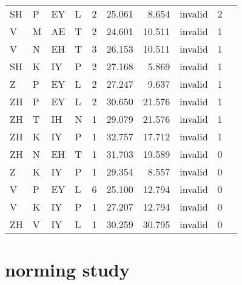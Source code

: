 \begin{longtable}{l@{ } l@{ } l@{ } l r r r r r r}
SH & P  & EY & L  & 2  & 25.061 & 8.654  & invalid & 2 \\
V  & M  & AE & T  & 2  & 24.601 & 10.511 & invalid & 1 \\
V  & N  & EH & T  & 3  & 26.153 & 10.511 & invalid & 1 \\
SH & K  & IY & P  & 2  & 27.168 & 5.869  & invalid & 1 \\
Z  & P  & EY & L  & 2  & 27.247 & 9.637  & invalid & 1 \\
ZH & P  & EY & L  & 2  & 30.650 & 21.576 & invalid & 1 \\
ZH & T  & IH & N  & 1  & 29.079 & 21.576 & invalid & 1 \\
ZH & K  & IY & P  & 1  & 32.757 & 17.712 & invalid & 1 \\
ZH & N  & EH & T  & 1  & 31.703 & 19.589 & invalid & 0 \\
Z  & K  & IY & P  & 1  & 29.354 & 8.557  & invalid & 0 \\
V  & P  & EY & L  & 6  & 25.100 & 12.794 & invalid & 0 \\
V  & K  & IY & P  & 1  & 27.207 & 12.794 & invalid & 0 \\
ZH & V  & IY & L  & 1  & 30.259 & 30.795 & invalid & 0 \\
\bottomrule
\end{longtable}

\section{\citet{Albright2003b} norming study} 

